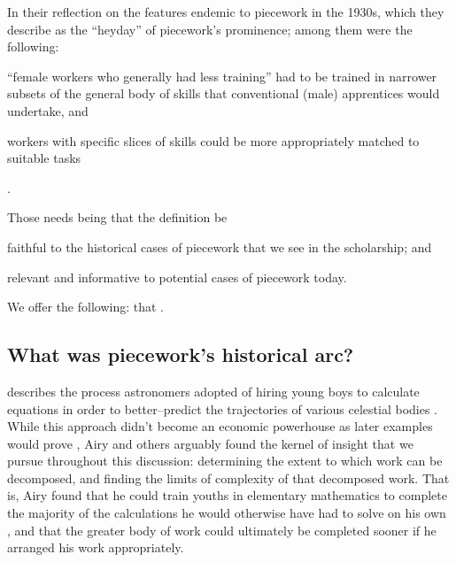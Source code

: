\documentclass[trackingWork]{subfiles}
\begin{document}
In their reflection on the features endemic to piecework in the 1930s,
which they describe as the ``heyday'' of piecework's prominence;
among them were the following:
\begin{inlinelist}
\item ``female workers who generally had less training'' had to be trained in narrower subsets of the general body of skills that conventional (male) apprentices would undertake, and
\item workers with specific slices of skills could be more appropriately matched to suitable tasks
\end{inlinelist}
\cite{hart2013rise}.

Those needs being that the definition be
\begin{inlinelist}
\item faithful to the historical cases of piecework that we see in the scholarship; and
\item relevant and informative to potential cases of piecework today.
\end{inlinelist}
We offer the following:
that \pieceworkdefinition.


\subsection{What was piecework's historical arc?}

\citeauthor{grier2013computers} describes the process astronomers adopted of hiring young boys
to calculate equations in order to better--predict the trajectories of various celestial bodies
\cite{grier2013computers}.
While this approach didn't become an economic powerhouse as later examples would prove%
, Airy and others arguably found the kernel of insight that we pursue throughout this discussion:
determining the extent to which work can be decomposed, and
finding the limits of complexity of that decomposed work.
That is, Airy found that he could train youths in elementary mathematics
to complete the majority of the calculations he would otherwise have had to solve on his own%
, and that the greater body of work could ultimately be completed sooner
if he arranged his work appropriately.
\end{document}
